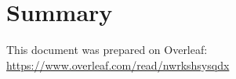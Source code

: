 \documentclass[a4paper, 11pt]{article}
\begin{document}
\section{Summary}



\vspace{10pt}
\vspace{4pt}
This document was prepared on Overleaf: %
\url{https://www.overleaf.com/read/nwrkshsysqdx}
\end{document}
